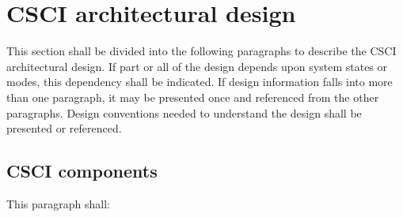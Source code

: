 \section{CSCI architectural design}

This section shall be divided into the following paragraphs to describe
the CSCI architectural design. If part or all of the design depends upon
system states or modes, this dependency shall be indicated. If design
information falls into more than one paragraph, it may be presented once
and referenced from the other paragraphs. Design conventions needed to
understand the design shall be presented or referenced.

\subsection{CSCI components}

This paragraph shall:

